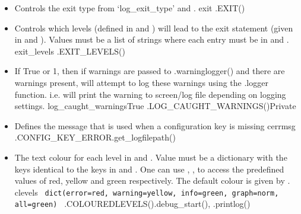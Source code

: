 \begin{itemize}
\ifdevguide
\item {} 
{Controls the exit type from `log\_exit\_type' and .}
{exit}
{\AllRecipes}{\spirouConst.EXIT()}{\spirouLog}
\fi


\ifdevguide
\item {} 
{Controls which levels (defined in  and ) will lead to the exit statement (given in  and ). Values must be a list of strings where each entry must be in  and .}
{exit\_levels}
{\AllRecipes}{\spirouConst.EXIT\_LEVELS()}{\spirouLog}
\fi


\ifdevguide
\item {}
{If True or 1, then if warnings are passed to \spirouLog.warninglogger() and there are warnings present, will attempt to log these warnings using the \spirouLog.logger function. i.e. will print the warning to screen/log file depending on logging settings.}
{log\_caught\_warnings}{True}
{\AllRecipes}{\spirouConst.LOG\_CAUGHT\_WARNINGS()}{\spirouLog}{Private}
\fi

\ifdevguide
\item {}
{Defines the message that is used when a configuration key is missing}
{cerrmsg}
{\AllRecipes}{\spirouConst.CONFIG\_KEY\_ERROR}{\spirouLog.get\_logfilepath()}
\fi

\ifdevguide
\item {} 
{The text colour for each level in  and . Value must be a dictionary with the keys identical to the keys in  and . One can use , ,  to access the predefined values of red, yellow and green respectively. The default colour is given by .}
{clevels}
{\lstinline[style=pythoninline]| dict(error=red, warning=yellow, info=green, graph=norm, all=green) |}
{\AllRecipes}{\spirouConst.COLOUREDLEVELS()}{\spirouLog.debug\_start(), \spirouLog.printlog()}
\fi


\end{itemize}
